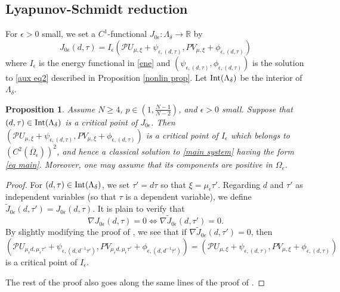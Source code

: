 \documentclass[reqno]{amsart}
\newtheorem{proposition}[theorem]{Proposition}
\theoremstyle{remark}
\newcommand{\ep}{\epsilon}
\newcommand{\R}{\mathbb{R}}
\newcommand{\mcp}{\mathcal{P}}
\newcommand{\wtj}{\widetilde{J}}
\newcommand{\ovom}{\overline{\Omega}}
\newcommand{\mx}{{\mu,\xi}}
\renewcommand{\(}{\left(}
\renewcommand{\)}{\right)}
\numberwithin{equation}{section}
\begin{document}
\subsection{Lyapunov-Schmidt reduction}
For $\ep > 0$ small, we set a $C^1$-functional $J_{0\ep}: \Lambda_\delta \to \R$ by
\[J_{0\ep}(d,\tau) = I_\ep\(\mcp U_\mx+\psi_{\ep,(d,\tau)}, PV_\mx+\phi_{\ep,(d,\tau)}\)\]
where $I_\ep$ is the energy functional in \eqref{ene} and $(\psi_{\ep,(d,\tau)},\phi_{\ep,(d,\tau)})$ is the solution to \eqref{aux eq2} described in Proposition \ref{nonlin prop}.
Let $\textup{Int}(\Lambda_\delta)$ be the interior of $\Lambda_\delta$.
\begin{proposition}\label{LSred}
Assume $N \ge 4$, $p \in (1,\frac{N-1}{N-2})$, and $\ep > 0$ small. Suppose that $(d,\tau) \in \textup{Int}(\Lambda_\delta)$ is a critical point of $J_{0\ep}$.
Then $(\mcp U_\mx+\psi_{\ep,(d,\tau)}, PV_\mx+\phi_{\ep,(d,\tau)})$ is a critical point of $I_\ep$ which belongs to $(C^2(\ovom_\ep))^2$, and hence a classical solution to \eqref{main system} having the form \eqref{eq main}.
Moreover, one may assume that its components are positive in $\Omega_\ep$.
\end{proposition}
\begin{proof}
For $(d,\tau) \in \textup{Int}(\Lambda_\delta)$, we set $\tau' = d\tau$ so that $\xi = \mu_\ep \tau'$.
Regarding $d$ and $\tau'$ as independent variables (so that $\tau$ is a dependent variable), we define $\wtj_{0\ep}(d,\tau') = J_{0\ep}(d,\tau)$. It is plain to verify that
\[\nabla J_{0\ep}(d,\tau) = 0 \Leftrightarrow \nabla \wtj_{0\ep}(d,\tau') = 0.\]
By slightly modifying the proof of \cite[Proposition 4.7]{KP}, we see that if $\nabla \wtj_{0\ep}(d,\tau') = 0$,
then $(\mcp U_{\mu_\ep d, \mu_\ep \tau'} +\psi_{\ep,(d,d^{-1}\tau')}, PV_{\mu_\ep d, \mu_\ep \tau'}+\phi_{\ep,(d,d^{-1}\tau')})
= (\mcp U_\mx+\psi_{\ep,(d,\tau)}, PV_\mx+\phi_{\ep,(d,\tau)})$ is a critical point of $I_\ep$.

The rest of the proof also goes along the same lines of the proof of \cite[Proposition 4.7]{KP}.
\end{proof}
\end{document}
